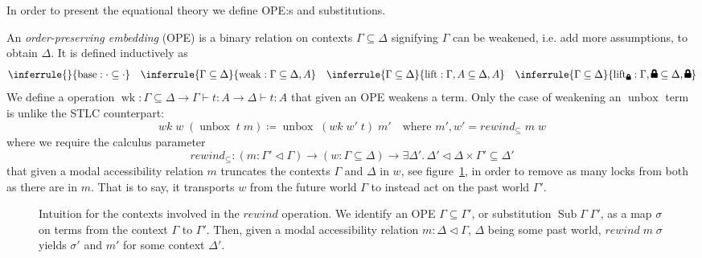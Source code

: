 \documentclass[12pt,twoside,openright]{report}
\numberwithin{equation}{chapter}
\numberwithin{figure}{chapter}
\numberwithin{table}{chapter}
\theoremstyle{definition}\newtheorem{definition}{Definition}
\newcommand{\lock}{\text{\tikz[baseline]{
      \fill[rounded corners=.1ex] (-.75ex,0) rectangle (.75ex,1ex);
      \draw[line width=.3ex] (-.4ex,.5ex) -- ++(0,.75ex) arc (180:0:.4ex) -- ++(0,-.75ex);
}}}
\begin{document}
In order to present the equational theory
we define OPE:s and substitutions.

An \emph{order-preserving embedding} (OPE) is a binary relation on contexts $\Gamma \subseteq \Delta$
signifying $\Gamma$ can be weakened, i.e. add more assumptions,
to obtain $\Delta$.
It is defined inductively as
\begin{equation*}
  \inferrule{ }{\operatorname{base} : \cdot \subseteq \cdot} \quad
  \inferrule{\Gamma \subseteq \Delta}{\operatorname{weak} : \Gamma \subseteq \Delta, A} \quad
  \inferrule{\Gamma \subseteq \Delta}{\operatorname{lift} : \Gamma, A \subseteq \Delta, A} \quad
  \inferrule{\Gamma \subseteq \Delta}{\operatorname{lift}_\lock : \Gamma, \lock \subseteq \Delta, \lock}
\end{equation*}
We define a operation
$\operatorname{wk} : \Gamma\subseteq\Delta \to \Gamma \vdash t : A \to \Delta \vdash t : A$
that given an OPE weakens a term.
Only the case of weakening an $\operatorname{unbox}$ term is unlike the STLC counterpart:
$$ \textit{wk} \; w \; (\operatorname{unbox} \; t \; m) \coloneqq \operatorname{unbox} \; (\textit{wk} \; w' \; t) \; m' \quad \text{where } m' , w' = \textit{rewind}_\subseteq \; m \; w $$
where we require the calculus parameter
$$ \textit{rewind}_\subseteq : (m : \Gamma'\lhd\Gamma) \to (w : \Gamma\subseteq\Delta) \to \exists \Delta'. \, \Delta'\lhd\Delta \times \Gamma'\subseteq\Delta' $$
that given a modal accessibility relation $m$
truncates the contexts $\Gamma$ and $\Delta$ in $w$,
see figure~\ref{fig:rewind},
in order to remove as many locks from both as there are in $m$.
That is to say, it transports $w$ from the future world $\Gamma$ to instead act on the past world $\Gamma'$.

\begin{figure}
  \centering
  \caption{Intuition for the contexts involved in the $\textit{rewind}$ operation.
    We identify an OPE $\Gamma \subseteq \Gamma'$,
    or substitution $\operatorname{Sub} \Gamma \; \Gamma'$,
    as a map $\sigma$ on terms from the context $\Gamma$ to $\Gamma'$.
    Then, given a modal accessibility relation $m : \Delta \lhd \Gamma$,
    $\Delta$ being some past world,
    $\textit{rewind} \; m \; \sigma$ yields $\sigma'$ and $m'$
    for some context $\Delta'$.
    \label{fig:rewind}}
\end{figure}
\end{document}
